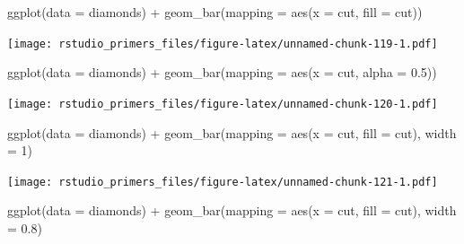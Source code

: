 \documentclass[
]{article}
\newenvironment{Shaded}{\begin{snugshade}}{\end{snugshade}}
\newcommand{\AttributeTok}[1]{\textcolor[rgb]{0.77,0.63,0.00}{#1}}
\newcommand{\DecValTok}[1]{\textcolor[rgb]{0.00,0.00,0.81}{#1}}
\newcommand{\FloatTok}[1]{\textcolor[rgb]{0.00,0.00,0.81}{#1}}
\newcommand{\FunctionTok}[1]{\textcolor[rgb]{0.00,0.00,0.00}{#1}}
\newcommand{\NormalTok}[1]{#1}
\newcommand{\SpecialCharTok}[1]{\textcolor[rgb]{0.00,0.00,0.00}{#1}}
\begin{document}
\begin{Shaded}
\begin{Highlighting}[]
\FunctionTok{ggplot}\NormalTok{(}\AttributeTok{data =}\NormalTok{ diamonds) }\SpecialCharTok{+}
  \FunctionTok{geom\_bar}\NormalTok{(}\AttributeTok{mapping =} \FunctionTok{aes}\NormalTok{(}\AttributeTok{x =}\NormalTok{ cut, }\AttributeTok{fill =}\NormalTok{ cut))}
\end{Highlighting}
\end{Shaded}

\texttt{[image: rstudio\_primers\_files/figure-latex/unnamed-chunk-119-1.pdf]}

\begin{Shaded}
\begin{Highlighting}[]
\FunctionTok{ggplot}\NormalTok{(}\AttributeTok{data =}\NormalTok{ diamonds) }\SpecialCharTok{+}
  \FunctionTok{geom\_bar}\NormalTok{(}\AttributeTok{mapping =} \FunctionTok{aes}\NormalTok{(}\AttributeTok{x =}\NormalTok{ cut, }\AttributeTok{alpha =} \FloatTok{0.5}\NormalTok{))}
\end{Highlighting}
\end{Shaded}

\texttt{[image: rstudio\_primers\_files/figure-latex/unnamed-chunk-120-1.pdf]}

\begin{Shaded}
\begin{Highlighting}[]
\FunctionTok{ggplot}\NormalTok{(}\AttributeTok{data =}\NormalTok{ diamonds) }\SpecialCharTok{+}
  \FunctionTok{geom\_bar}\NormalTok{(}\AttributeTok{mapping =} \FunctionTok{aes}\NormalTok{(}\AttributeTok{x =}\NormalTok{ cut, }\AttributeTok{fill =}\NormalTok{ cut), }\AttributeTok{width =} \DecValTok{1}\NormalTok{)}
\end{Highlighting}
\end{Shaded}

\texttt{[image: rstudio\_primers\_files/figure-latex/unnamed-chunk-121-1.pdf]}

\begin{Shaded}
\begin{Highlighting}[]
\FunctionTok{ggplot}\NormalTok{(}\AttributeTok{data =}\NormalTok{ diamonds) }\SpecialCharTok{+}
  \FunctionTok{geom\_bar}\NormalTok{(}\AttributeTok{mapping =} \FunctionTok{aes}\NormalTok{(}\AttributeTok{x =}\NormalTok{ cut, }\AttributeTok{fill =}\NormalTok{ cut), }\AttributeTok{width =} \FloatTok{0.8}\NormalTok{)}
\end{Highlighting}
\end{Shaded}
\end{document}
